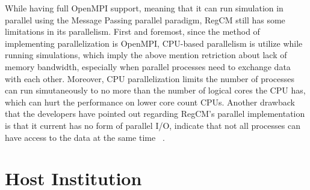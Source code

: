 While having full OpenMPI support, meaning that it can run simulation in parallel using the Message Passing parallel paradigm, RegCM still has some limitations in its parallelism. First and foremost, since the method of implementing parallelization is OpenMPI, CPU-based parallelism is utilize while running simulations, which imply the above mention retriction about lack of memory bandwidth, especially when parallel processes need to exchange data with each other. Moreover, CPU parallelization limits the number of processes can run simutaneously to no more than the number of logical cores the CPU has, which can hurt the performance on lower core count CPUs. Another drawback that the developers have pointed out regarding RegCM's parallel implementation is that it current has no form of parallel I/O, indicate that not all processes can have access to the data at the same time ~\cite{regcm_man}. \\

\section{Host Institution}

